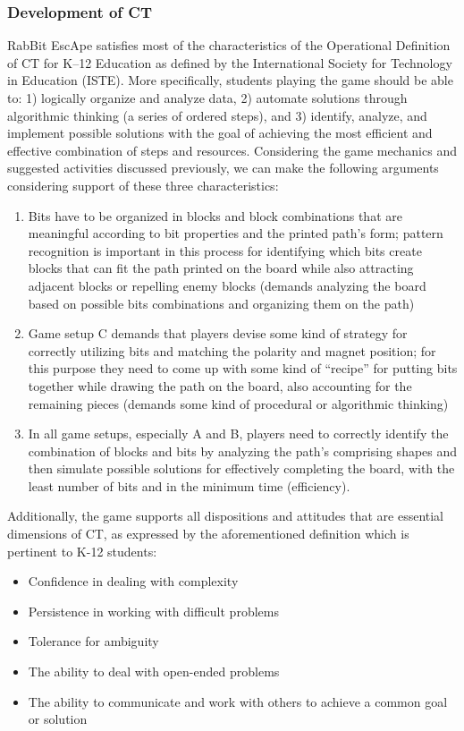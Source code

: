 \documentclass{acm_proc_article-sp}
\begin{document}
\subsubsection{Development of CT}
RabBit EscApe satisfies most of the characteristics of the Operational Definition of CT for K–12 Education as defined by the International Society for Technology in Education (ISTE)\cite{operationalct}. More specifically, students playing the game should be able to: 1) logically organize and analyze data, 2) automate solutions through algorithmic thinking (a series of ordered steps), and 3) identify, analyze, and implement possible solutions with the goal of achieving the most efficient and effective combination of steps and resources. Considering the game mechanics and suggested activities discussed previously, we can make the following arguments considering support of these three characteristics:

\begin{enumerate}
\item{Bits have to be organized in blocks and block combinations that are meaningful according to bit properties and the printed path's form; pattern recognition is important in this process for identifying which bits create blocks that can fit the path printed on the board while also attracting adjacent blocks or repelling enemy blocks (demands analyzing the board based on possible bits combinations and organizing them on the path)}
\item{Game setup C demands that players devise some kind of strategy for correctly utilizing bits and matching the polarity and magnet position; for this purpose they need to come up with some kind of ``recipe'' for putting bits together while drawing the path on the board, also accounting for the remaining pieces (demands some kind of procedural or algorithmic thinking)}
\item{In all game setups, especially A and B, players need to correctly identify the combination of blocks and bits by analyzing the path's comprising shapes and then simulate possible solutions for effectively completing the board, with the least number of bits and in the minimum time (efficiency).}
\end{enumerate}

Additionally, the game supports all dispositions and attitudes that are essential dimensions of CT, as expressed by the aforementioned definition which is pertinent to K-12 students:
\begin{itemize}
       \item Confidence in dealing with complexity
       \item Persistence in working with difficult problems
       \item Tolerance for ambiguity
       \item The ability to deal with open-ended problems
       \item The ability to communicate and work with others to achieve a common goal or solution
\end{itemize}
\end{document}
